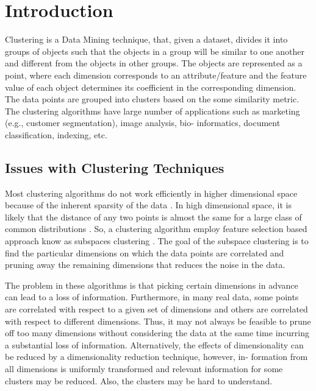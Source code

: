 \chapter{Introduction}
\label{Chapter1}

Clustering is a Data Mining technique, that, given a dataset, divides it into
groups of objects such that the objects in a group will be
similar to one another and different from the objects in other
groups\cite{bib17}. The objects are represented as a point, where
each dimension corresponds to an attribute/feature and the
feature value of each object determines its coefficient in the
corresponding dimension. The data points are grouped into
clusters based on the some similarity metric. The clustering
algorithms have large number of applications such as marketing (e.g., customer segmentation), image analysis, bio-
informatics, document classification, indexing, etc.

\section{Issues with Clustering Techniques}

Most clustering algorithms do not work efficiently in higher
dimensional space because of the inherent sparsity of the
data \cite{bib3}. In high dimensional space, it is likely that the
distance of any two points is almost the same for a large
class of common distributions \cite{bib5}. So, a clustering algorithm
employ feature selection based approach know as subspaces
clustering \cite{bib11}. The goal of the subspace clustering is to
find the particular dimensions on which the data points are
correlated and pruning away the remaining dimensions that
reduces the noise in the data.

The problem in these algorithms is that picking certain dimensions in advance can
lead to a loss of information. Furthermore, in many real
data, some points are correlated with respect to a given set
of dimensions and others are correlated with respect to different dimensions. Thus, it may not always be feasible to
prune off too many dimensions without considering the data
at the same time incurring a substantial loss of information.
Alternatively, the effects of dimensionality can be reduced
by a dimensionality reduction technique\cite{bib6}, however, in-
formation from all dimensions is uniformly transformed and
relevant information for some clusters may be reduced. Also,
the clusters may be hard to understand.


